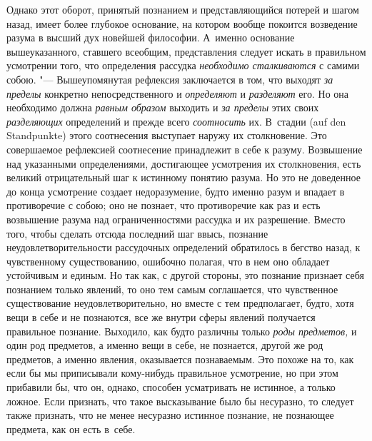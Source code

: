 Однако этот оборот, принятый познанием и представляющийся потерей и шагом
назад, имеет более глубокое основание, на котором вообще покоится
возведение разума в высший дух новейшей философии. А~именно основание
вышеуказанного, ставшего всеобщим, представления следует искать в
правильном усмотрении того, что определения рассудка
{\em необходимо сталкиваются} с самими собою. "---
Вышеупомянутая рефлексия заключается в том, что выходят
{\em за пределы} конкретно непосредственного и
{\em определяют} и {\em разделяют}
его. Но она необходимо должна {\em равным образом}
выходить и {\em за пределы} этих своих
{\em разделяющих} определений и прежде всего
{\em соотносить} их. В~стадии (auf den Standpunkte)
этого соотнесения выступает наружу их столкновение. Это совершаемое
рефлексией соотнесение принадлежит в себе к разуму. Возвышение над
указанными определениями, достигающее усмотрения их столкновения, есть
великий отрицательный шаг к истинному понятию разума. Но это не доведенное
до конца усмотрение создает недоразумение, будто именно разум и впадает в
противоречие с собою; оно не познает, что противоречие как раз и есть
возвышение разума над ограниченностями рассудка и их разрешение. Вместо
того, чтобы сделать отсюда последний шаг ввысь, познание
неудовлетворительности рассудочных определений обратилось в бегство назад,
к чувственному существованию, ошибочно полагая, что в нем оно обладает
устойчивым и единым. Но так как, с другой стороны, это познание признает
себя познанием только явлений, то оно тем самым соглашается, что
чувственное существование неудовлетворительно, но вместе с тем
предполагает, будто, хотя вещи в себе и не познаются, все же внутри сферы
явлений получается правильное познание. Выходило, как будто различны только
{\em роды предметов,} и один род предметов, а именно
вещи в себе, не познается, другой же род предметов, а именно явления,
оказывается познаваемым. Это похоже на то, как если бы мы приписывали
кому-нибудь правильное усмотрение, но при этом прибавили бы, что он,
однако, способен усматривать не истинное, а только ложное. Если признать,
что такое высказывание было бы несуразно, то следует также признать, что не
менее несуразно истинное познание, не познающее предмета, как он есть в~себе.

